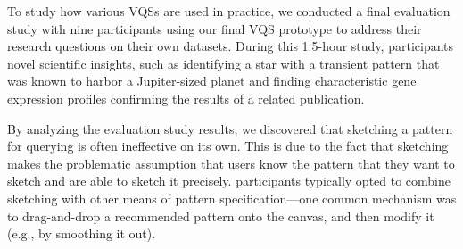 \par To study how various VQSs are used in practice, we conducted a final evaluation study with nine participants using our final VQS prototype to address their research questions on their own datasets. During this 1.5-hour study, participants  novel scientific insights,
 such as identifying a star with a transient pattern that was known to harbor a Jupiter-sized planet
 and finding characteristic gene expression profiles confirming the results of a related publication. 
 \par By analyzing the evaluation study results, we discovered that sketching a pattern for querying is often ineffective on its own. This is due to the fact that sketching makes the problematic assumption that users know the pattern that they want to sketch and are able to sketch it precisely.  participants typically opted to combine sketching with other means of pattern specification---one common mechanism was to drag-and-drop a recommended pattern onto the canvas, and then modify it (e.g., by smoothing it out). %
